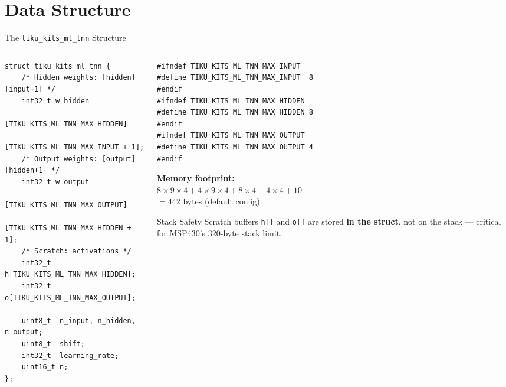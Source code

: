 \documentclass[aspectratio=169, 10pt]{beamer}
\begin{document}
\section{Data Structure}

\begin{frame}[fragile]{The \texttt{tiku\_kits\_ml\_tnn} Structure}
\begin{columns}[T]
\begin{column}{0.48\textwidth}
\begin{lstlisting}[style=cstyle,
  title={ml/classification/tiku\_kits\_ml\_tnn.h}]
struct tiku_kits_ml_tnn {
    /* Hidden weights: [hidden][input+1] */
    int32_t w_hidden
        [TIKU_KITS_ML_TNN_MAX_HIDDEN]
        [TIKU_KITS_ML_TNN_MAX_INPUT + 1];
    /* Output weights: [output][hidden+1] */
    int32_t w_output
        [TIKU_KITS_ML_TNN_MAX_OUTPUT]
        [TIKU_KITS_ML_TNN_MAX_HIDDEN + 1];
    /* Scratch: activations */
    int32_t h[TIKU_KITS_ML_TNN_MAX_HIDDEN];
    int32_t o[TIKU_KITS_ML_TNN_MAX_OUTPUT];

    uint8_t  n_input, n_hidden, n_output;
    uint8_t  shift;
    int32_t  learning_rate;
    uint16_t n;
};
\end{lstlisting}
\end{column}

\begin{column}{0.48\textwidth}
\begin{lstlisting}[style=cstyle,
  title={Configuration macros}]
#ifndef TIKU_KITS_ML_TNN_MAX_INPUT
#define TIKU_KITS_ML_TNN_MAX_INPUT  8
#endif
#ifndef TIKU_KITS_ML_TNN_MAX_HIDDEN
#define TIKU_KITS_ML_TNN_MAX_HIDDEN 8
#endif
#ifndef TIKU_KITS_ML_TNN_MAX_OUTPUT
#define TIKU_KITS_ML_TNN_MAX_OUTPUT 4
#endif
\end{lstlisting}

\textbf{Memory footprint:}\\
$8 \times 9 \times 4 + 4 \times 9 \times 4 + 8 \times 4 + 4 \times 4 + 10$\\
$= 442$ bytes (default config).

\vspace{0.3em}
\begin{block}{Stack Safety}
Scratch buffers \texttt{h[]} and \texttt{o[]} are stored
\textbf{in the struct}, not on the stack --- critical for
MSP430's 320-byte stack limit.
\end{block}
\end{column}
\end{columns}
\end{frame}
\end{document}
